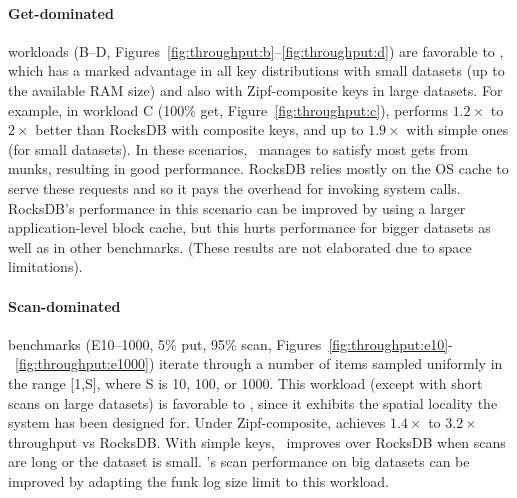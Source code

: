 \paragraph{ Get-dominated} 
workloads (B--D, Figures~\ref{fig:throughput:b}--\ref{fig:throughput:d}) are 
favorable to 
\sys, which has a marked advantage in all key distributions with small datasets (up to the available RAM size) 
and also with Zipf-composite keys in large datasets. 
For example, in workload C (100\% get, Figure~\ref{fig:throughput:c}), 
\sys\/ performs $1.2\times$ to $2\times$ better than RocksDB with composite keys,
and up to $1.9\times$  with simple ones (for small datasets). 
In these scenarios, \sys\  manages to satisfy most gets from munks, resulting in good performance.
RocksDB relies mostly on the OS cache to serve these requests and so it pays the overhead for invoking system calls. 
RocksDB's performance in this scenario can be improved by 
using a larger application-level block cache,
but this hurts performance for bigger datasets as well as in other benchmarks.
(These results are not elaborated due to space limitations). 

\paragraph{ Scan-dominated} benchmarks (E10--1000,  5\% put, 95\% scan, Figures~\ref{fig:throughput:e10}-~\ref{fig:throughput:e1000})
iterate through a number of items 
sampled uniformly in the range [1,S], where S is  10, 100, or 1000. 
This workload (except with short scans on  large datasets) is favorable to \sys, 
since it exhibits the spatial locality the system has been designed for. 
Under Zipf-composite, \sys\/ achieves $1.4\times$ to $3.2\times$ throughput vs RocksDB.   
With simple keys, \sys\ improves over RocksDB when scans are long or the dataset is small. 
\sys's scan performance on big datasets can be improved by adapting the funk log size limit to this workload. 
 

